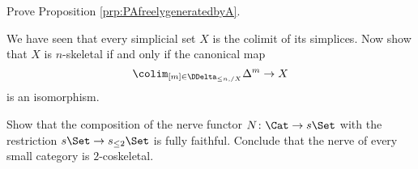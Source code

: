 













\begin{exercises}
  \item%
    \label{exercise:PAfreelygenerated}
    Prove Proposition \ref{prp:PAfreelygeneratedbyA}.
  \item%
    \label{exercise:nskeletonascolimit}
    We have seen that every simplicial set $X$ is the colimit of its simplices.
    Now show that $X$ is $n$-skeletal if and only if the canonical map
    \[
      \colim_{[m] \in \DDelta_{\leq n, /X}} \Delta^m \to X
    \]
    is an isomorphism.
  \item%
    \label{exercise:nerve2cosk}
    Show that the composition of the nerve functor $N \colon \Cat \to s\Set$ with the restriction $s\Set \to s_{\leq 2}\Set$ is fully faithful.
    Conclude that the nerve of every small category is $2$-coskeletal.
\end{exercises}



